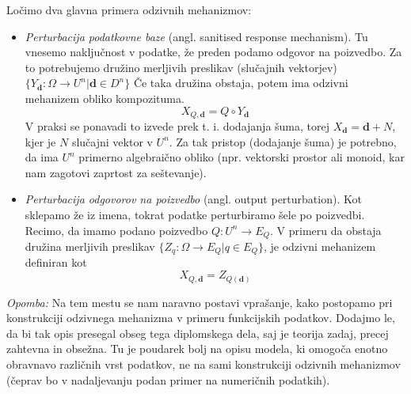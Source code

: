 \documentclass[mat1]{article}
\theoremstyle{definition}
\begin{document}
\newline
\newline
Ločimo dva glavna primera odzivnih mehanizmov:
\begin{itemize}
\item \textit{Perturbacija podatkovne baze} (angl. sanitised response mechanism). Tu vnesemo naključnost v podatke, že preden podamo odgovor na poizvedbo. Za to potrebujemo družino merljivih preslikav (slučajnih vektorjev) $\{ Y_{\textbf{d}}: \Omega \rightarrow U^n | \textbf{d} \in D^n\}$ Če taka družina obstaja, potem ima odzivni mehanizem obliko kompozituma.
\begin{equation}\label{odzivni2}
 X_{Q,\textbf{d}} = Q \circ Y_{\textbf{d}} \tag{2}
\end{equation} 
V praksi se ponavadi to izvede prek t. i. dodajanja šuma, torej $X_{\textbf{d}} = \textbf{d}+N$, kjer je $N$ slučajni vektor v $U^n$. Za tak pristop (dodajanje šuma) je potrebno, da ima $U^n$ primerno algebraično obliko (npr. vektorski prostor ali monoid, kar nam zagotovi zaprtost za seštevanje).
\item \textit{Perturbacija odgovorov na poizvedbo} (angl. output perturbation). Kot sklepamo že iz imena, tokrat podatke perturbiramo šele po poizvedbi. Recimo, da imamo podano poizvedbo $Q: U^n \rightarrow E_{Q}$. V primeru da obstaja družina merljivih preslikav $ \{Z_{q}:\Omega \rightarrow E_{Q} | q  \in E_{Q} \}$, je odzivni mehanizem definiran kot
\begin{equation}\label{odzivni3}
X_{Q,\textbf{d}}=Z_{Q(\textbf{d})}\tag{3}
\end{equation} 
\end{itemize}

\textit{Opomba:} Na tem mestu se nam naravno postavi vprašanje, kako postopamo pri konstrukciji odzivnega mehanizma v primeru funkcijskih podatkov. Dodajmo le, da bi tak opis presegal obseg tega diplomskega dela, saj je teorija zadaj, precej zahtevna in obsežna. Tu je poudarek bolj na opisu modela, ki omogoča enotno obravnavo različnih vrst podatkov, ne na sami konstrukciji odzivnih mehanizmov (čeprav bo v nadaljevanju podan primer na numeričnih podatkih).
\end{document}
